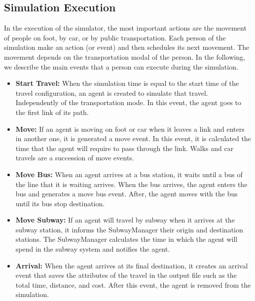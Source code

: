 \subsection{Simulation Execution}
\label{sub:execucao}

In the execution of the simulator, the most important actions are the movement of people on foot, by car, or by public transportation. Each person of the simulation make an action (or event) and then schedules its next movement. The movement depends on the transportation modal of the person. In the following, we describe the main events that a person can execute during the simulation.

\begin{itemize}

\item \textbf{Start Travel: } When the simulation time is equal to the start time of the travel configuration, an agent is created to simulate that travel. Independently of the transportation mode. In this event, the agent goes to the first link of its path.

\item \textbf{Move: } If an agent is moving on foot or car when it leaves a link and enters in another one, it is generated a move event. In this event, it is calculated the time that the agent will require to pass through the link. Walks and car travels are a succession of move events.

\item \textbf{Move Bus:} When an agent arrives at a bus station, it waits until a bus of the line that it is waiting arrives. When the bus arrives, the agent enters the bus and generates a move bus event. After, the agent moves with the bus until its bus stop destination.

\item \textbf{Move Subway: } If an agent will travel by subway when it arrives at the subway station, it informs the SubwayManager their origin and destination stations. The SubwayManager calculates the time in which the agent will spend in the subway system and notifies the agent. 

\item \textbf{Arrival: } When the agent arrives at its final destination, it creates an arrival event that saves the attributes of the travel in the output file such as the total time, distance, and cost. After this event, the agent is removed from the simulation.

\end{itemize}

